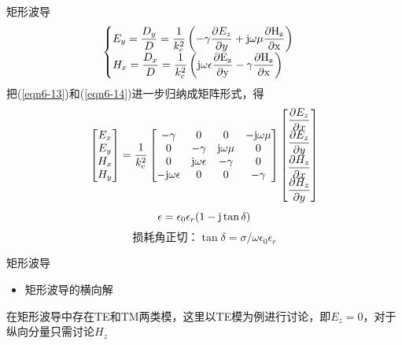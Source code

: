 \begin{frame}{矩形波导}
    \begin{align}
        \begin{cases}
            E_y=\dfrac{D_y}{D}=\dfrac{1}{k_c^2}\left(-\gamma\dfrac{\partial E_z}{\partial y}+\rm{j}\omega\mu\dfrac{\partial H_z}{\partial x}\right)\\
            H_x=\dfrac{D_x}{D}=\dfrac{1}{k_c^2}\left(\rm{j}\omega\epsilon\dfrac{\partial E_z}{\partial y}-\gamma\dfrac{\partial H_z}{\partial x}\right)
        \end{cases}
        \label{eqn6-14}
    \end{align}
    把(\ref{eqn6-13})和(\ref{eqn6-14})进一步归纳成矩阵形式，得
    \begin{align}
        \begin{bmatrix}
            E_x\\
            E_y\\
            H_x\\
            H_y\\
        \end{bmatrix}
        =\frac{1}{k_c^2}
        \begin{bmatrix}
            -\gamma & 0 & 0 & -\rm{j}\omega\mu\\
            0 & -\gamma & \rm{j}\omega\mu & 0 \\
            0 & \rm{j}\omega\epsilon & -\gamma & 0\\
            -\rm{j}\omega\epsilon & 0 & 0 & -\gamma\\
        \end{bmatrix}
        \begin{bmatrix}
            \dfrac{\partial E_z}{\partial x}\\
            \dfrac{\partial E_z}{\partial y}\\
            \dfrac{\partial H_z}{\partial x}\\
            \dfrac{\partial H_z}{\partial y}\\
        \end{bmatrix}
    \end{align}
    $$\epsilon=\epsilon_0\epsilon_r(1-\rm{j}\tan\delta)$$
    $$\text{损耗角正切：} \tan\delta=\sigma/\omega\epsilon_0\epsilon_r$$
\end{frame}

\begin{frame}{矩形波导}
    \begin{itemize}
        \item 矩形波导的横向解
    \end{itemize}
    在矩形波导中存在TE和TM两类模，这里以TE模为例进行讨论，即$E_z=0$，对于纵向分量只需讨论$H_z$
\end{frame}

